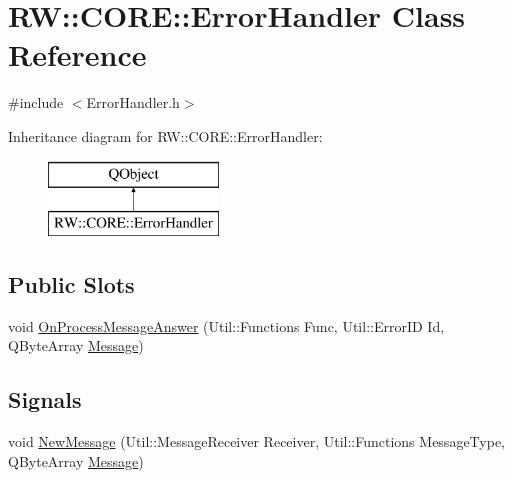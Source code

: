 \hypertarget{class_r_w_1_1_c_o_r_e_1_1_error_handler}{}\section{RW\+:\+:C\+O\+RE\+:\+:Error\+Handler Class Reference}
\label{class_r_w_1_1_c_o_r_e_1_1_error_handler}


{\ttfamily \#include $<$Error\+Handler.\+h$>$}

Inheritance diagram for RW\+:\+:C\+O\+RE\+:\+:Error\+Handler\+:\begin{figure}[H]
\begin{center}
\leavevmode
\includegraphics[height=2.000000cm]{class_r_w_1_1_c_o_r_e_1_1_error_handler}
\end{center}
\end{figure}
\subsection*{Public Slots}
\begin{DoxyCompactItemize}
\item 
void \hyperlink{class_r_w_1_1_c_o_r_e_1_1_error_handler_a7e93cff1de31d52deb41eb509730b2f0}{On\+Process\+Message\+Answer} (Util\+::\+Functions Func, Util\+::\+Error\+ID Id, Q\+Byte\+Array \hyperlink{namespace_r_w_1_1_c_o_r_e_a571834b44d0e3fab58aa6abfe5a02988}{Message})
\end{DoxyCompactItemize}
\subsection*{Signals}
\begin{DoxyCompactItemize}
\item 
void \hyperlink{class_r_w_1_1_c_o_r_e_1_1_error_handler_ad85d6dc6e06eec5d8709969600fbf059}{New\+Message} (Util\+::\+Message\+Receiver Receiver, Util\+::\+Functions Message\+Type, Q\+Byte\+Array \hyperlink{namespace_r_w_1_1_c_o_r_e_a571834b44d0e3fab58aa6abfe5a02988}{Message})
\end{DoxyCompactItemize}
